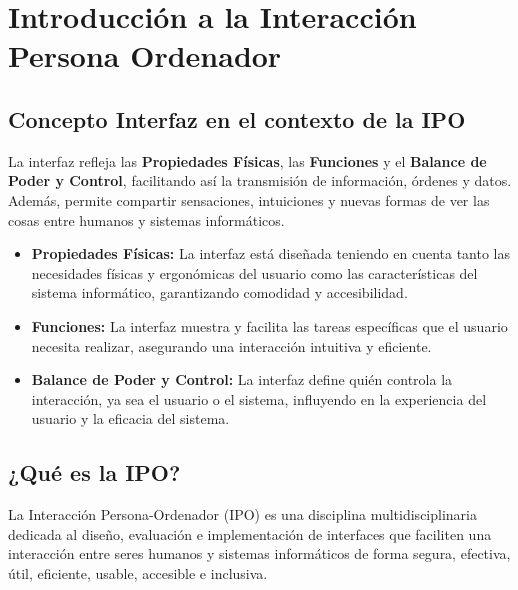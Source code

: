 \documentclass{report}
\begin{document}
\pagestyle{empty}
\newpage

\tableofcontents

\newpage

\chapter{Introducción a la Interacción Persona Ordenador}

\section{Concepto Interfaz en el contexto de la IPO}
La interfaz refleja las \textbf{Propiedades Físicas}, las \textbf{Funciones} y el \textbf{Balance de Poder y Control}, facilitando así la transmisión de información, órdenes y datos. Además, permite compartir sensaciones, intuiciones y nuevas formas de ver las cosas entre humanos y sistemas informáticos.

\vspace{4mm} %

\begin{itemize}[itemsep=0.1em] %
    \item \textbf{Propiedades Físicas:} La interfaz está diseñada teniendo en cuenta tanto las necesidades físicas y ergonómicas del usuario como las características del sistema informático, garantizando comodidad y accesibilidad.
    \item \textbf{Funciones:} La interfaz muestra y facilita las tareas específicas que el usuario necesita realizar, asegurando una interacción intuitiva y eficiente.
    \item \textbf{Balance de Poder y Control:} La interfaz define quién controla la interacción, ya sea el usuario o el sistema, influyendo en la experiencia del usuario y la eficacia del sistema.
\end{itemize}

\section{¿Qué es la IPO?}
La Interacción Persona-Ordenador (IPO) es una disciplina multidisciplinaria dedicada al diseño, evaluación e implementación de interfaces que faciliten una interacción entre seres humanos y sistemas informáticos de forma segura, efectiva, útil, eficiente, usable, accesible e inclusiva.
\end{document}
